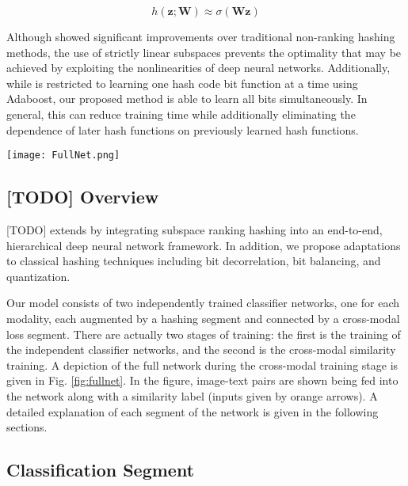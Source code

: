 \documentclass[letterpaper]{article}
\begin{document}
\begin{equation}
\label{eq:hfunsoft}
h(\mathbf{z}; \mathbf{W}) \approx \sigma(\mathbf{Wz})
\end{equation}

Although \cite{kai} showed significant improvements over traditional non-ranking hashing methods, the use of strictly linear subspaces prevents the optimality that may be achieved by exploiting the nonlinearities of deep neural networks. Additionally, while \cite{kai} is restricted to learning one hash code bit function at a time using Adaboost, our proposed method is able to learn all bits simultaneously. In general, this can reduce training time while additionally eliminating the dependence of later hash functions on previously learned hash functions.

\begin{figure*}
	\centering
	\texttt{[image: FullNet.png]}
	\caption{\label{fig:fullnet}Full Network structure for deep cross-modal hashing. Inputs to the network are given by the large arrows. The network consists of three segments: the classification segment, the hashing segment, and the loss segment.}
\end{figure*}

\subsection{[TODO] Overview}

[TODO] extends \cite{kai} by integrating subspace ranking hashing into an end-to-end, hierarchical deep neural network framework. In addition, we propose adaptations to classical hashing techniques including bit decorrelation, bit balancing, and quantization.

Our model consists of two independently trained classifier networks, one for each modality, each augmented by a hashing segment and connected by a cross-modal loss segment. There are actually two stages of training: the first is the training of the independent classifier networks, and the second is the cross-modal similarity training. A depiction of the full network during the cross-modal training stage is given in Fig. \ref{fig:fullnet}. In the figure, image-text pairs are shown being fed into the network along with a similarity label (inputs given by orange arrows). A detailed explanation of each segment of the network is given in the following sections. 

\subsection{Classification Segment}
\end{document}
